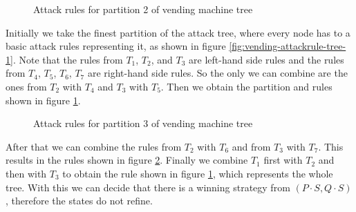 \begin{example}
\begin{figure}[ht]
  \caption{Attack rules for partition 2 of vending machine tree}
  \label{fig:vending-attackrule-tree-2}
\end{figure}

  Initially we take the finest partition of the attack tree, where every
  node has to a basic attack rules representing it, as shown in figure 
  \ref{fig:vending-attackrule-tree-1}.
  Note that the rules from $T_1$, $T_2$, and $T_3$ are left-hand side rules
  and the rules from $T_4$, $T_5$, $T_6$, $T_7$ are right-hand side rules.
  So the only we can combine are the ones from $T_2$ with $T_4$ and
  $T_3$ with $T_5$. Then we obtain the partition and rules shown in
  figure \ref{fig:vending-attackrule-tree-2}.

\begin{figure}[ht]
  \centering
{}
  \caption{Attack rules for partition 3 of vending machine tree}
  \label{fig:vending-attackrule-tree-3}
\end{figure}

  After that we can combine the rules from $T_2$ with $T_6$ and from $T_3$
  with $T_7$. This results in the rules shown in
  figure \ref{fig:vending-attackrule-tree-3}.
  Finally we combine $T_1$ first with $T_2$ and then with $T_3$ to obtain
  the rule shown in figure \ref{fig:vending-attackrule-tree-2}, which
  represents the whole tree. With this we can decide that there is
  a winning strategy from $(P⋅S, Q⋅S)$, therefore the states do not refine.


\end{example}
